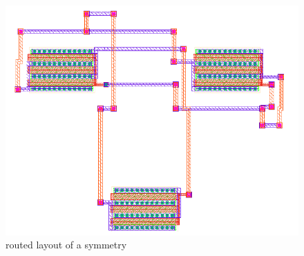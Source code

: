\begin{figure}
	\centering
	\includegraphics[scale=.6]{FIG/symmetry_routed.png}
  	\caption{routed layout of a symmetry}
	\label{fig:symmetry_routed}
\end{figure}

